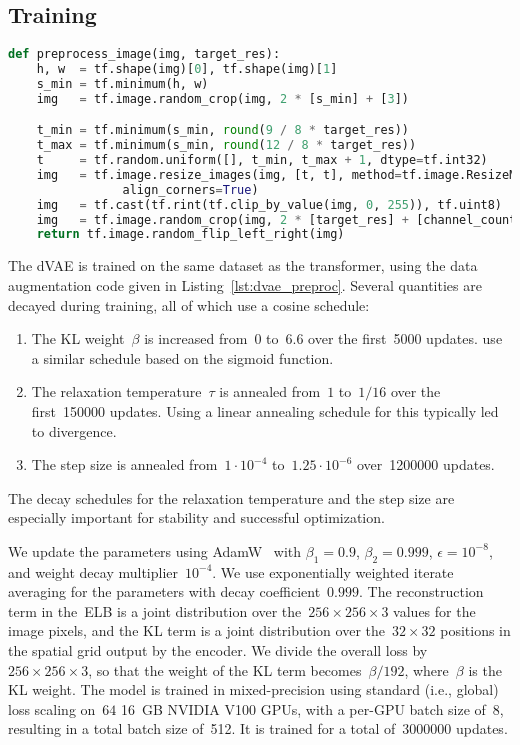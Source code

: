 \documentclass{article}
\begin{document}
\subsection{Training}
\label{sec:dvae_train}
\begin{lstlisting}[language=Python,basicstyle=\footnotesize\ttfamily,caption={TensorFlow~\cite{abadi2016tensorflow} image preprocessing code for training dVAE. We use \texttt{target\_res = 256} and \texttt{channel\_count = 3}.},label={lst:dvae_preproc},captionpos=b,float=tp,floatplacement=tbp]
def preprocess_image(img, target_res):
    h, w  = tf.shape(img)[0], tf.shape(img)[1]
    s_min = tf.minimum(h, w)
    img   = tf.image.random_crop(img, 2 * [s_min] + [3])

    t_min = tf.minimum(s_min, round(9 / 8 * target_res))
    t_max = tf.minimum(s_min, round(12 / 8 * target_res))
    t     = tf.random.uniform([], t_min, t_max + 1, dtype=tf.int32)
    img   = tf.image.resize_images(img, [t, t], method=tf.image.ResizeMethod.AREA,
                align_corners=True)
    img   = tf.cast(tf.rint(tf.clip_by_value(img, 0, 255)), tf.uint8)
    img   = tf.image.random_crop(img, 2 * [target_res] + [channel_count])
    return tf.image.random_flip_left_right(img)
\end{lstlisting}
The dVAE is trained on the same dataset as the transformer, using the data augmentation code given in Listing~\ref{lst:dvae_preproc}. Several quantities are decayed during training, all of which use a cosine schedule:
\begin{enumerate}
    \item The KL weight~$\beta$ is increased from~$0$ to~$6.6$ over the first~\num{5000} updates. \citet{bowman2015generating} use a similar schedule based on the sigmoid function.
    \item The relaxation temperature~$\tau$ is annealed from~$1$ to~$1 / 16$ over the first~\num{150000} updates. Using a linear annealing schedule for this typically led to divergence.
    \item The step size is annealed from~$1 \cdot 10^{-4}$ to~$1.25 \cdot 10^{-6}$ over~\num{1200000} updates.
\end{enumerate}
The decay schedules for the relaxation temperature and the step size are especially important for stability and successful optimization.

We update the parameters using AdamW~\cite{loshchilov2017decoupled} with $\beta_1=0.9$, $\beta_2=0.999$, $\epsilon=10^{-8}$, and weight decay multiplier~$10^{-4}$. We use exponentially weighted iterate averaging for the parameters with decay coefficient~$0.999$. The reconstruction term in the~ELB is a joint distribution over the~$256 \times 256 \times 3$ values for the image pixels, and the KL term is a joint distribution over the~$32 \times 32$ positions in the spatial grid output by the encoder. We divide the overall loss by~$256 \times 256 \times 3$, so that the weight of the KL term becomes~$\beta / 192$, where~$\beta$ is the KL weight. The model is trained in mixed-precision using standard (i.e., global) loss scaling on~$64$ 16~GB NVIDIA V100 GPUs, with a per-GPU batch size of~$8$, resulting in a total batch size of~512. It is trained for a total of~\num{3000000} updates.
\end{document}
